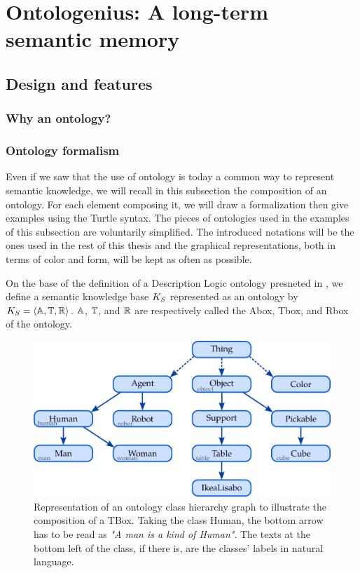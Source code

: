 \ifdefined{}
\else
\setcounter{chapter}{2} %
\dominitoc
\faketableofcontents
\fi

\chapter{Ontologenius: A long-term semantic memory}
\minitoc

\section{Design and features}

\subsection{Why an ontology?}

\subsection{Ontology formalism}

Even if we saw that the use of ontology is today a common way to represent semantic knowledge, we will recall in this subsection the composition of an ontology. For each element composing it, we will draw a formalization then give examples using the Turtle syntax. The pieces of ontologies used in the examples of this subsection are voluntarily simplified. The introduced notations will be the ones used in the rest of this thesis and the graphical representations, both in terms of color and form, will be kept as often as possible.

On the base of the definition of a Description Logic ontology presneted in \cite{fokoue_2006_summary}, we define a semantic knowledge base $K_S$ represented as an ontology by  $K_S = \langle \mathbb{A}, \mathbb{T}, \mathbb{R} \rangle$. $\mathbb{A}$, $\mathbb{T}$, and $\mathbb{R}$ are respectively called the Abox, Tbox, and Rbox of the ontology.


\begin{figure}[h!]
\centering
\includegraphics[scale=0.4]{figures/chapter2/Tbox.png}
\caption{\label{fig:Tbox} Representation of an ontology class hierarchy graph to illustrate the composition of a TBox. Taking the class Human, the bottom arrow has to be read as \textit{"A man is a kind of Human"}. The texts at the bottom left of the class, if there is, are the classes' labels in natural language.}
\end{figure}

